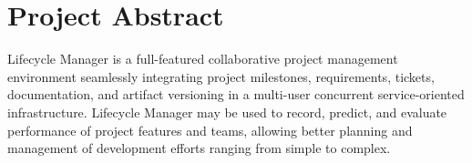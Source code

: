 
\section{Project Abstract}

Lifecycle Manager is a full-featured collaborative project management
environment seamlessly integrating project milestones, requirements, tickets,
documentation, and artifact versioning in a multi-user concurrent
service-oriented infrastructure. Lifecycle Manager may be used to record,
predict, and evaluate performance of project features and teams, allowing
better planning and management of development efforts ranging from simple to complex.


